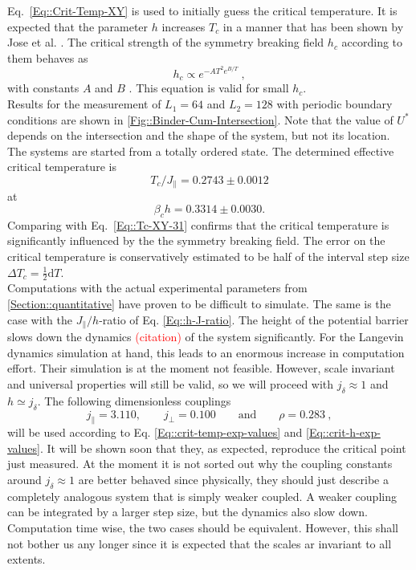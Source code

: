 		Eq.~\eqref{Eq::Crit-Temp-XY} is used to initially guess the critical temperature. It is expected that the parameter $h$ increases $T_c$ in a manner that has been shown by Jose et al. \cite{jose1977renormalization}. The critical strength of the symmetry breaking field $h_c$ according to them behaves as
		\begin{equation} \label{Eq::h_c-T-dependence}
			h_c \propto e^{-AT^2 e^{B/T}}~,
		\end{equation}
		with constants $A$ and $B$ . This equation is valid for small $h_c$. \\
		
		 Results for the measurement of $L_1 =	64$ and $L_2 =	128$ with periodic boundary conditions are shown in \autoref{Fig::Binder-Cum-Intersection}. Note that the value of $U^*$ depends on the intersection and the shape of the system, but not its location.  The systems are started from a totally ordered state. The determined effective critical temperature is
		\begin{equation} \label{Eq::crit-temp-exp-values}
			T_c /	J_\parallel  = 0.2743 \pm 0.0012	
		\end{equation}
		at
		\begin{equation} \label{Eq::crit-h-exp-values}
			\beta_c h = 0.3314 \pm 0.0030.
		\end{equation}
		Comparing with Eq.~\eqref{Eq::Tc-XY-31} confirms that the critical temperature is significantly influenced by the the symmetry breaking field. The error on the critical temperature is conservatively estimated to be half of the interval step size $\Delta T_c =	\tfrac{1}{2} \text{d}T$. \\
		
		 Computations with the actual experimental parameters from \autoref{Section::quantitative} have proven to be difficult to simulate. The same is the case with the $J_\parallel / h$-ratio of Eq. \eqref{Eq::h-J-ratio}. The height of the potential barrier slows down the dynamics \textcolor{red}{(citation)} of the system significantly. For the Langevin dynamics simulation at hand, this leads to an enormous increase in computation effort.  Their simulation is at the moment not feasible. However, scale invariant and universal properties will still be valid, so we will proceed with $j_\delta \approx 1$ and $h \simeq j_\delta$. The following dimensionless couplings
		 \begin{equation} \label{Eq::good-dimensionless-parameters}
		 	j_\parallel =	3.110, \qquad j_\perp = 0.100 \qquad \text{and} \qquad \rho = 0.283 ~,
		 \end{equation}
	 	will be used according to Eq. \eqref{Eq::crit-temp-exp-values} and \eqref{Eq::crit-h-exp-values}. It will be shown soon that they, as expected, reproduce the critical point just measured. At the moment it is not sorted out why the coupling constants around $j_\delta \approx 1$ are better behaved since physically, they should just describe a completely analogous system that is simply weaker coupled. A weaker coupling can be integrated by a larger step size, but the dynamics also slow down. Computation time wise, the two cases should be equivalent. However, this shall not bother us any longer since it is expected that the scales ar invariant to all extents.
